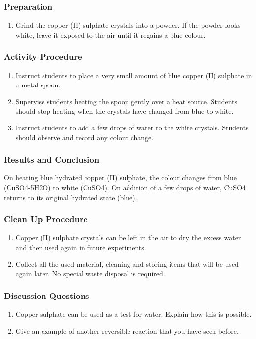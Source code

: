 \subsubsection*{Preparation}
\begin{enumerate}
\item{Grind the copper (II) sulphate crystals into a powder. If the powder looks white, leave it exposed to the air until it regains a blue colour.}
\end{enumerate}

\subsubsection*{Activity Procedure}
\begin{enumerate}
\item{Instruct students to place a very small amount of blue copper (II) sulphate in a metal spoon.}
\item{Supervise students heating the spoon gently over a heat source. Students should stop heating when the crystals have changed from blue to white.}
\item{Instruct students to add a few drops of water to the white crystals. Students should observe and record any colour change.}
\end{enumerate}

\subsubsection*{Results and Conclusion}
On heating blue hydrated copper (II) sulphate, the colour changes from blue (CuSO4-5H2O) to white (CuSO4). On addition of a few drops of water, CuSO4 returns to its original hydrated state (blue).

\subsubsection*{Clean Up Procedure}
\begin{enumerate}
\item{Copper (II) sulphate crystals can be left in the air to dry the excess water and then used again in future experiments.}
\item{Collect all the used material, cleaning and storing items that will be used again later. No special waste disposal is required.}
\end{enumerate}

\subsubsection*{Discussion Questions}
\begin{enumerate}
\item{Copper sulphate can be used as a test for water. Explain how this is possible.}
\item{Give an example of another reversible reaction that you have seen before.}
\end{enumerate}

